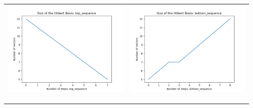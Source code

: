 \documentclass[10pt]{article}
\begin{document}
\begin{tabular}{c|c}
\begin{minipage}{.4\textwidth}
\includegraphics[width=\textwidth]{"DATA/5d/5 generators 2 bound J/top_sequence SIZE"}
\end{minipage} &
\begin{minipage}{.4\textwidth}
\includegraphics[width=\textwidth]{"DATA/5d/5 generators 2 bound J bottomup/bottom_sequence SIZE"}
\end{minipage} \\ \\
\hline \\\begin{minipage}{.4\textwidth}

\end{minipage}
\end{tabular}
\end{document}
